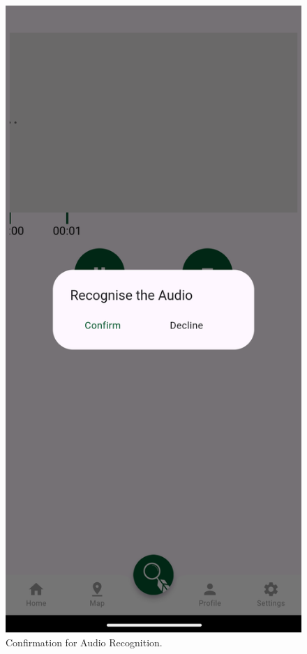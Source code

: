 \begin{figure}[h!]
    \centering
    \includegraphics[scale=0.18]{images/confirmation.png}
    \caption{Confirmation for Audio Recognition.}
\end{figure}
